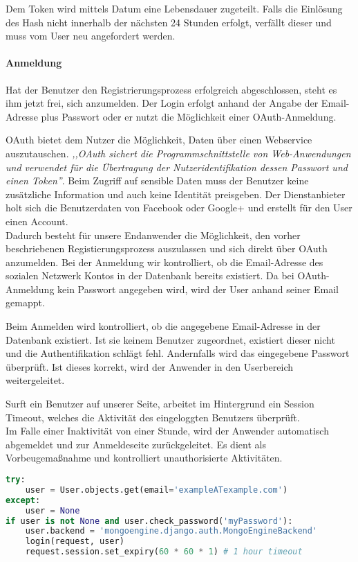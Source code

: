 Dem Token wird mittels Datum eine Lebensdauer zugeteilt. Falls die Einlösung des Hash nicht innerhalb der nächsten 24 Stunden erfolgt, verfällt dieser und muss vom User neu angefordert werden. 

\paragraph{Anmeldung}
Hat der Benutzer den Registrierungsprozess erfolgreich abgeschlossen, steht es ihm jetzt frei, sich anzumelden. Der Login erfolgt anhand der Angabe der Email-Adresse plus Passwort oder er nutzt die Möglichkeit einer \gls{OAuth}-Anmeldung.

OAuth bietet dem Nutzer die Möglichkeit, Daten über einen Webservice auszutauschen. \textit{,,OAuth sichert die Programmschnittstelle von Web-Anwendungen und verwendet für die Übertragung der Nutzeridentifikation dessen Passwort und einen Token''}\cite{OAUTH}. Beim Zugriff auf sensible Daten muss der Benutzer keine zusätzliche Information und auch keine Identität preisgeben. Der Dienstanbieter holt sich die Benutzerdaten von Facebook oder Google+ und erstellt für den User einen Account.\\
Dadurch besteht für unsere Endanwender die Möglichkeit, den vorher beschriebenen Registierungsprozess auszulassen und sich direkt über OAuth anzumelden. Bei der Anmeldung wir kontrolliert, ob die Email-Adresse des sozialen Netzwerk Kontos in der Datenbank bereits existiert. Da bei OAuth-Anmeldung kein Passwort angegeben wird, wird der User anhand seiner Email gemappt.


Beim Anmelden wird kontrolliert, ob die angegebene Email-Adresse in der Datenbank existiert. Ist sie keinem Benutzer zugeordnet, existiert dieser nicht und die Authentifikation schlägt fehl. Andernfalls wird das eingegebene Passwort überprüft. Ist dieses korrekt, wird der Anwender in den Userbereich weitergeleitet.

Surft ein Benutzer auf unserer Seite, arbeitet im Hintergrund ein Session Timeout, welches die Aktivität des eingeloggten Benutzers überprüft.\\
Im Falle einer Inaktivität von einer Stunde, wird der Anwender automatisch abgemeldet und zur Anmeldeseite zurückgeleitet. Es dient als Vorbeugemaßnahme und kontrolliert unauthorisierte Aktivitäten.

\begin{lstlisting}[caption={Session Timeout}, language=Python]
try:
    user = User.objects.get(email='exampleATexample.com')
except:
    user = None
if user is not None and user.check_password('myPassword'):
    user.backend = 'mongoengine.django.auth.MongoEngineBackend'
    login(request, user)
    request.session.set_expiry(60 * 60 * 1) # 1 hour timeout
\end{lstlisting}
\newpage 

